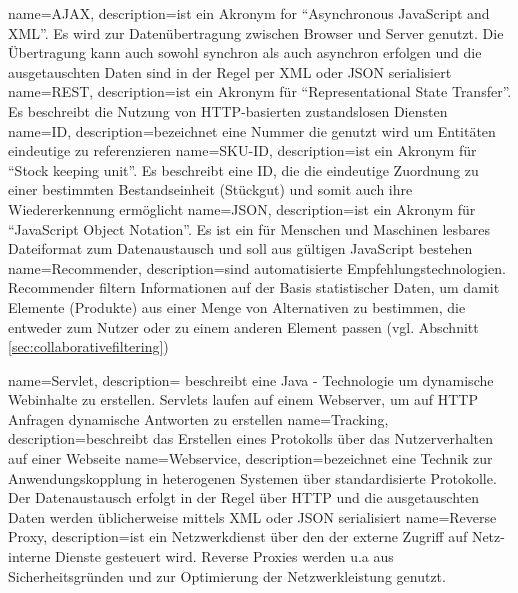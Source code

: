 
{
  name=AJAX,
  description={ist ein Akronym for ``Asynchronous JavaScript and XML''. Es wird zur Datenübertragung zwischen Browser und Server genutzt. Die Übertragung kann auch sowohl synchron als auch asynchron erfolgen und die ausgetauschten Daten sind in der Regel per XML oder JSON serialisiert}
}
{
  name=REST,
  description={ist ein Akronym für ``Representational State Transfer''. Es beschreibt die Nutzung von HTTP-basierten zustandslosen Diensten}
}
{
  name=ID,
  description={bezeichnet eine Nummer die genutzt wird um Entitäten eindeutige zu referenzieren}
}
{
  name=SKU-ID,
  description={ist ein Akronym für ``Stock keeping unit''. Es beschreibt eine ID, die die eindeutige Zuordnung zu einer bestimmten Bestandseinheit (Stückgut) und somit auch ihre Wiedererkennung ermöglicht}
}
{
  name=JSON,
  description={ist ein Akronym für ``JavaScript Object Notation''. Es ist ein für Menschen und Maschinen lesbares Dateiformat zum Datenaustausch und soll aus gültigen JavaScript bestehen}
}
{
  name=Recommender,
  description={sind automatisierte Empfehlungstechnologien. Recommender filtern Informationen auf der Basis statistischer Daten, um damit Elemente (Produkte) aus einer Menge von Alternativen zu bestimmen, die entweder zum Nutzer oder zu einem anderen Element passen (vgl. Abschnitt \ref{sec:collaborativefiltering})}
}

{
  name=Servlet,
  description={ beschreibt eine Java - Technologie um dynamische Webinhalte zu erstellen. Servlets laufen auf einem Webserver, um auf HTTP Anfragen dynamische Antworten zu erstellen}
}
{
  name=Tracking,
  description={beschreibt das Erstellen eines Protokolls über das Nutzerverhalten auf einer Webseite}
}
{
  name=Webservice,
  description={bezeichnet eine Technik zur Anwendungskopplung in heterogenen Systemen über standardisierte Protokolle. Der Datenaustausch erfolgt in der Regel über HTTP und die ausgetauschten Daten werden üblicherweise mittels XML oder JSON serialisiert}
}
{
  name=Reverse Proxy,
  description={ist ein Netzwerkdienst über den der externe Zugriff auf Netz-interne Dienste gesteuert wird. Reverse Proxies werden u.a aus Sicherheitsgründen und zur Optimierung der Netzwerkleistung genutzt.}
 } 
